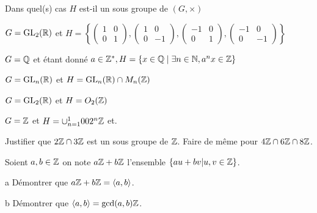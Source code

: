 \documentclass{report}
\begin{document}
\begin{exo}
    Dans quel(s) cas \(H\) est-il un sous groupe de \(\left(G,\times\right)\)
    \begin{q}{1}
        \(G=\textrm{GL}_2(\mathbb{R})\) et \(H = \left\{
            \begin{pmatrix} 1 & 0 \\ 0 & 1 \end{pmatrix},
            \begin{pmatrix} 1 & 0 \\ 0 & -1 \end{pmatrix},
            \begin{pmatrix} -1 & 0 \\ 0 & 1 \end{pmatrix},
            \begin{pmatrix} -1 & 0 \\ 0 & -1 \end{pmatrix}\right\}\)
    \end{q}
    \begin{q}{2}
        \(G=\mathbb{Q}\) et étant donné \(a\in\mathbb{Z}^*, H=\left\{ x\in\mathbb{Q}\mid\exists n\in\mathbb{N},a^nx\in\mathbb{Z} \right\}\)
    \end{q}
    \begin{q}{3}
        \(G=\mathrm{GL}_n(\mathbb{R})\) et \(H=\mathrm{GL}_n(\mathbb{R})\cap M_n(\mathbb{Z})\)
    \end{q}
    \begin{q}{4}
        \(G=\textrm{GL}_2(\mathbb{R})\) et \(H=O_2(\mathbb{Z})\)
    \end{q}
    \begin{q}{5}
        \(G=\mathbb{Z}\) et \(H=\cup_{n=1}^100 2^n\mathbb{Z}\) et.
    \end{q}
\end{exo}

\begin{exo}
    \begin{q}{1}
        Justifier que \(2\mathbb{Z}\cap3\mathbb{Z}\) est un sous groupe de \(\mathbb{Z}\). Faire de même
        pour \(4\mathbb{Z}\cap6\mathbb{Z}\cap8\mathbb{Z}\).
    \end{q}
    \begin{q}{2}
        Soient \(a,b\in\mathbb{Z}\) on note \(a\mathbb{Z}+b\mathbb{Z}\) l'ensemble \(\left\{ au+bv
        | u,v\in\mathbb{Z} \right\}\).
        \begin{q}{a}
            Démontrer que \(a\mathbb{Z}+b\mathbb{Z}=\langle a,b\rangle\).
        \end{q}
        \begin{q}{b}
            Démontrer que \(\langle a,b\rangle=\gcd(a,b)\mathbb{Z}\).
        \end{q}
    \end{q}
\end{exo}
\end{document}
